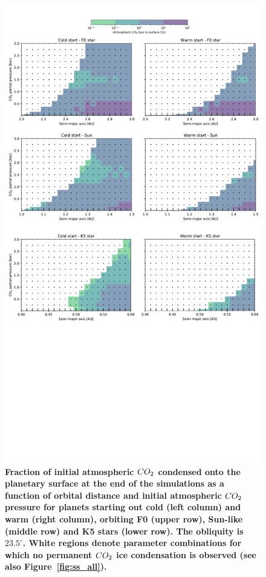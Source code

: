 \documentclass[fleqn,usenatbib]{mnras}
\providecommand{\DIFadd}[1]{{\bf #1}} %
\providecommand{\DIFaddFL}[1]{\DIFadd{#1}} %
\begin{document}
\begin{figure}
	\includegraphics[width=\textwidth]{Figures/CO2_iceloss.pdf}
    \caption{\DIFaddFL{Fraction of initial atmospheric $CO_{\rm 2}$ condensed onto the planetary surface at the end of the simulations as a function of orbital distance and initial atmospheric $CO_{\rm 2}$ pressure for planets starting out cold (left column) and warm (right column), orbiting F0 (upper row), Sun-like (middle row) and K5 stars (lower row). The obliquity is $23.5^{\circ}$. White regions denote parameter combinations for which no permanent $CO_{\rm 2}$ ice condensation is observed (see also Figure~\ref{fig:ss_all}).}}
    \label{fig:CO2_iceloss}
\end{figure}
\end{document}
